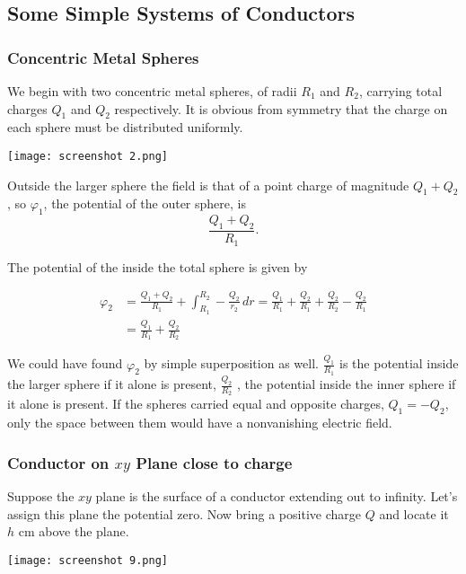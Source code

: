 \documentclass[svgnames]{article}
\begin{document}
\subsection{Some Simple Systems of Conductors}

\subsubsection{Concentric Metal Spheres} 

We begin with two concentric metal spheres, of radii $R_1$ and $R_2$, carrying
total charges $Q_1$ and $Q_2$ respectively. It is obvious from symmetry that
the charge on each sphere must be distributed uniformly. \\

\begin{center}
\texttt{[image: screenshot 2.png]}
\end{center}

Outside the larger sphere the field is that of a point charge of magnitude $Q_1
+ Q_2$, so $\varphi_1$, the potential of the outer sphere, is 
\[
\frac{Q_1+Q_2}{R_1}
.\] 

The potential of the inside the total sphere is given by 

\begin{align*}
  \varphi_2 &= \frac{Q_1+Q_2}{R_1} + \int_{R_1}^{R_2} -\frac{Q_2}{r_2} \, dr
= \frac{Q_1}{R_1} + \frac{Q_2}{R_1} + \frac{Q_2}{R_2} - \frac{Q_2}{R_1} \\
            & = \frac{Q_1}{R_1} + \frac{Q_2}{R_2}       
\end{align*}

We could have found $\varphi_2$ by simple superposition as well. $\frac{Q_1}{R_1}$
is the potential inside the larger sphere if it alone is present,
$\frac{Q_2}{R_2}$ , the potential inside the inner sphere if it alone is
present. If the spheres carried equal and opposite charges, $Q_1 = -Q_2$, only
the space between them would have a nonvanishing electric field.

\subsubsection{Conductor on $xy$ Plane close to charge}

Suppose the $xy$ plane is the surface of a conductor extending out to infinity.
Let's assign this plane the potential zero. Now bring a positive charge $Q$ and
locate it $h$ cm above the plane. 


\begin{center}
\texttt{[image: screenshot 9.png]}
\end{center}
\end{document}
